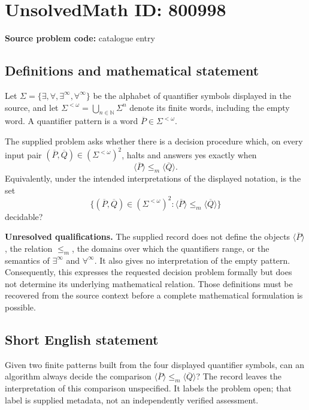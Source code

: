 \documentclass[11pt]{article}
\newcommand{\N}{\mathbb{N}}
\begin{document}
\section*{UnsolvedMath ID: 800998}
\textbf{Source problem code:} catalogue entry
\subsection{Definitions and mathematical statement}
Let \(\Sigma=\{\exists,\forall,\exists^\infty,\forall^\infty\}\) be the alphabet of quantifier symbols displayed in the source, and let \(\Sigma^{<\omega}=\bigcup_{n\in\N}\Sigma^n\) denote its finite words, including the empty word. A quantifier pattern is a word \(\overline P\in\Sigma^{<\omega}\).

The supplied problem asks whether there is a decision procedure which, on every input pair \((\overline P,\overline Q)\in(\Sigma^{<\omega})^2\), halts and answers yes exactly when
\[
\langle\overline P\rangle\leq_m\langle\overline Q\rangle.
\]
Equivalently, under the intended interpretations of the displayed notation, is the set
\[
\bigl\{(\overline P,\overline Q)\in(\Sigma^{<\omega})^2:
\langle\overline P\rangle\leq_m\langle\overline Q\rangle\bigr\}
\]
decidable?

\textbf{Unresolved qualifications.} The supplied record does not define the objects \(\langle\overline P\rangle\), the relation \(\leq_m\), the domains over which the quantifiers range, or the semantics of \(\exists^\infty\) and \(\forall^\infty\). It also gives no interpretation of the empty pattern. Consequently, this expresses the requested decision problem formally but does not determine its underlying mathematical relation. Those definitions must be recovered from the source context before a complete mathematical formulation is possible.
\subsection{Short English statement}
Given two finite patterns built from the four displayed quantifier symbols, can an algorithm always decide the comparison \(\langle\overline P\rangle\leq_m\langle\overline Q\rangle\)? The record leaves the interpretation of this comparison unspecified. It labels the problem open; that label is supplied metadata, not an independently verified assessment.
\end{document}

